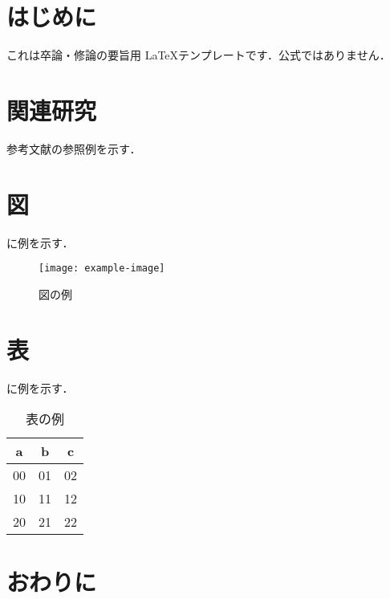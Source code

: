 \documentclass{abstract}
\begin{document}
\makeabstracttitle[
presentno={B9-99},
title={表題表題表題表題表題表題表題表題表\\題表題表題表題表題表題表題表題表題表題表題表題表題表題表題表題表題},
labname={サンプル研究室},
lastname={鳥取},
firstname={太郎},
]
\section{はじめに}
これは卒論・修論の要旨用 \LaTeX テンプレートです．公式ではありません．
\section{関連研究}
参考文献の参照例を示す\cite{Article:2024:Sunadai}．
\section{図}
に例を示す．

\begin{figure}[t]
  \centering
  \texttt{[image: example-image]}
  \caption{図の例}
  \label{fig:example-image}
\end{figure}
\section{表}
に例を示す．

\begin{table}[t]
  \centering
  \caption{表の例}
  \begin{tabular}{|c c c|}
    a & b & c \\
    \hline
    00 & 01 & 02 \\ 
    10 & 11 & 12 \\ 
    20 & 21 & 22 \\ 
  \end{tabular}
  \label{tab:example-example}
\end{table}
\section{おわりに}


\end{document}

